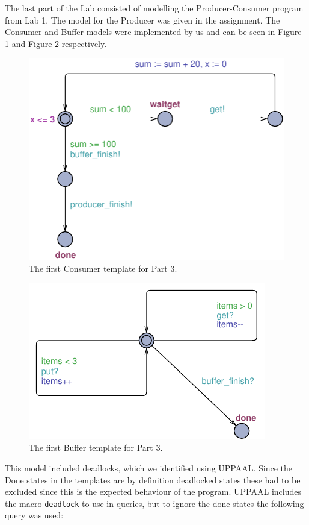 \documentclass[a4paper,10pt]{article}
\begin{document}
The last part of the Lab consisted of modelling the Producer-Consumer program from Lab 1. The model for the Producer was given in the assignment. The Consumer and Buffer models were implemented by us and can be seen in Figure \ref{img:part3consumer} and Figure \ref{img:part3buffer} respectively.

\begin{figure}[h]
  \center
  \includegraphics{Part3Consumer.pdf}
  \caption{The first Consumer template for Part 3.}
  \label{img:part3consumer}
\end{figure}

\begin{figure}[h]
  \center
  \includegraphics{Part3BufferFixed.pdf}
  \caption{The first Buffer template for Part 3.}
  \label{img:part3buffer}
\end{figure}

This model included deadlocks, which we identified using UPPAAL. Since the Done states in the templates are by definition deadlocked states these had to be excluded since this is the expected behaviour of the program. UPPAAL includes the macro \texttt{deadlock} to use in queries, but to ignore the done states the following query was used:
\end{document}

